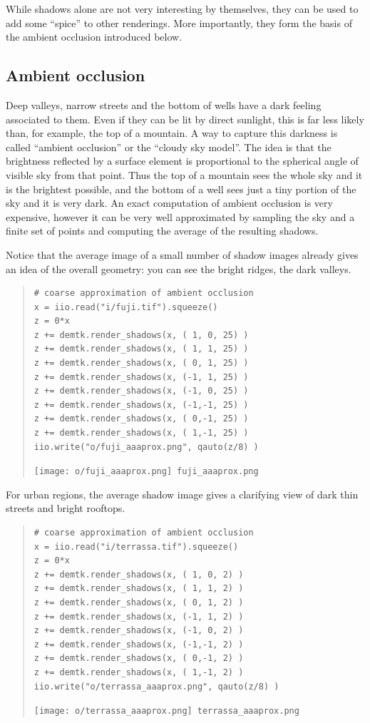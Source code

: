 While shadows alone are not very interesting by themselves, they can be used
to add some ``spice'' to other renderings.  More importantly, they form the
basis of the ambient occlusion introduced below.


\clearpage
\subsection{Ambient occlusion}

Deep valleys, narrow streets and the bottom of wells have a dark feeling
associated to them.  Even if they can be lit by direct sunlight, this is far
less likely than, for example, the top of a mountain.  A way to capture this
darkness is called ``ambient occlusion'' or the ``cloudy sky model''.  The
idea is that the brightness reflected by a surface element is proportional to
the spherical angle of visible sky from that point.  Thus the top of a
mountain sees the whole sky and it is the brightest possible, and the bottom
of a well sees just a tiny portion of the sky and it is very dark.  An exact
computation of ambient occlusion is very expensive, however it can be
very well approximated by sampling the sky and a finite set of points and
computing the average of the resulting shadows.


Notice that the average image of a small number of shadow images already
gives an idea of the overall geometry: you can see the bright ridges, the
dark valleys.
\begin{quote}
 \begin{verbatim}
# coarse approximation of ambient occlusion
x = iio.read("i/fuji.tif").squeeze()
z = 0*x
z += demtk.render_shadows(x, ( 1, 0, 25) )
z += demtk.render_shadows(x, ( 1, 1, 25) )
z += demtk.render_shadows(x, ( 0, 1, 25) )
z += demtk.render_shadows(x, (-1, 1, 25) )
z += demtk.render_shadows(x, (-1, 0, 25) )
z += demtk.render_shadows(x, (-1,-1, 25) )
z += demtk.render_shadows(x, ( 0,-1, 25) )
z += demtk.render_shadows(x, ( 1,-1, 25) )
iio.write("o/fuji_aaaprox.png", qauto(z/8) )
\end{verbatim}
\texttt{[image: o/fuji\_aaaprox.png]}~\verb+fuji_aaaprox.png+
\end{quote}

For urban regions, the average shadow image gives a clarifying view of dark
thin streets and bright rooftops.
\begin{quote}
 \begin{verbatim}
# coarse approximation of ambient occlusion
x = iio.read("i/terrassa.tif").squeeze()
z = 0*x
z += demtk.render_shadows(x, ( 1, 0, 2) )
z += demtk.render_shadows(x, ( 1, 1, 2) )
z += demtk.render_shadows(x, ( 0, 1, 2) )
z += demtk.render_shadows(x, (-1, 1, 2) )
z += demtk.render_shadows(x, (-1, 0, 2) )
z += demtk.render_shadows(x, (-1,-1, 2) )
z += demtk.render_shadows(x, ( 0,-1, 2) )
z += demtk.render_shadows(x, ( 1,-1, 2) )
iio.write("o/terrassa_aaaprox.png", qauto(z/8) )
\end{verbatim}
\texttt{[image: o/terrassa\_aaaprox.png]}~\verb+terrassa_aaaprox.png+
\end{quote}

